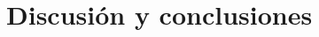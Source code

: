 \documentclass[main.tex]{subfiles}
\begin{document}
	\onlyinsubfile{

		
		\tableofcontents
		\listoftodos[Notes]
	}

\chapter{Discusión y conclusiones}
\lipsum[1-8]


\onlyinsubfile{
	
	
}
\end{document}
